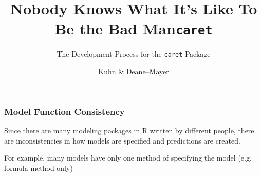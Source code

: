 \documentclass[12 pt]{beamer}\usepackage[]{graphicx}\usepackage[]{color}
\title{\large Nobody Knows What It's Like To Be the Bad Man}
\subtitle{The Development Process for the {\tt{caret}} Package}
\author[Subham Kuhn \& Deane--Mayer]
{%
   \texorpdfstring{
        \begin{columns}
            \column{.45\linewidth}
            \centering
            Max Kuhn\\
            Pfizer Global R$\&$D\\
            \href{mailto:max.kuhn@pfizer.com}{max.kuhn@pfizer.com}
            \column{.45\linewidth}
            \centering
            Zachary Deane--Mayer\\
            Cognius\\
            \href{mailto:zach.mayer@gmail.com}{zach.mayer@gmail.com}
        \end{columns}
   }
   {John Doe \& Jane Doe}
}
\date{}
\begin{document}
\begin{frame}[plain]
  \maketitle
\end{frame}

\title{\tt{caret}}
\author{Kuhn \& Deane--Mayer}


  \begin{frame}[fragile]
\frametitle{Model Function Consistency}

Since there are many modeling packages in R written by different people,
there are inconsistencies in how models are specified and
predictions are created.

\vspace{.15in}

For example, many models have only one method of specifying the model
(e.g. formula method only)


\end{frame}

\end{document}
